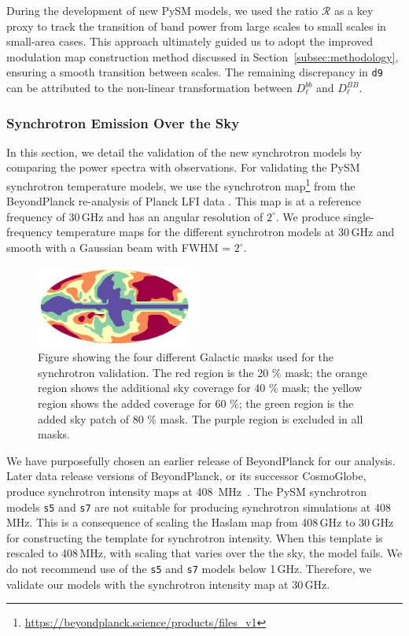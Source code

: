 \documentclass[twocolumn]{aastex631}
\begin{document}
During the development of new PySM models, we used the ratio $\mathcal{R}$ as a key proxy to track the transition of band power from large scales to small scales in small-area cases. This approach ultimately guided us to adopt the improved modulation map construction method discussed in Section~\ref{subsec:methodology}, ensuring a smooth transition between scales. The remaining discrepancy in \texttt{d9} can be attributed to the non-linear transformation between $D_\ell^{bb}$ and $D_\ell^{BB}$.

\subsubsection{Synchrotron Emission Over the Sky} \label{sec:sync_validation}

In this section, we detail the validation of the new synchrotron models by comparing the power spectra with observations. For validating the PySM synchrotron temperature models, we use the synchrotron map\footnote{\url{https://beyondplanck.science/products/files\_v1}} from the BeyondPlanck re-analysis of Planck LFI data \citep{Andersen:2023}. This map is at a reference frequency of 30\,GHz and has an angular resolution of $2^\circ$. We produce single-frequency temperature maps for the different synchrotron models at 30\,GHz and smooth with a Gaussian beam with FWHM = $2^\circ$.

\begin{figure}
    \centering
    \includegraphics[width=0.46\textwidth]{figures/SYNC_mask_stack.png}
    \caption{Figure showing the four different Galactic masks used for the synchrotron validation. The red region is the 20 \% mask; the orange region shows the additional sky coverage for 40 \% mask; the yellow region shows the added coverage for 60 \%; the green region is the added sky patch of 80 \% mask. The purple region is excluded in all masks. }
    \label{fig:sync_masks}
\end{figure}

We have purposefully chosen an earlier release of BeyondPlanck for our analysis. Later data release versions of BeyondPlanck, or its successor CosmoGlobe, produce synchrotron intensity maps at 408~MHz~\citep{Watts:2023}. The PySM synchrotron models \texttt{s5} and \texttt{s7} are not suitable for producing synchrotron simulations at 408\,MHz. This is a consequence of scaling the Haslam map from 408\,GHz to 30\,GHz for constructing the template for synchrotron intensity. When this template is rescaled to 408\,MHz, with scaling that varies over the the sky, the model fails. We do not recommend use of the \texttt{s5} and \texttt{s7} models below 1\,GHz. Therefore, we validate our models with the synchrotron intensity map at 30\,GHz.
\end{document}
